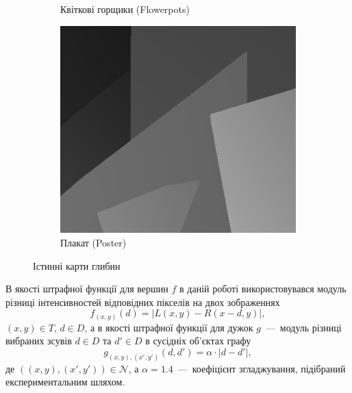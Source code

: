 \begin{figure}[h]
\begin{subfigure}[t]{0.32\textwidth}
        \caption{Квіткові горщики (Flowerpots)}
        \label{fig:flowerpots:ground:truth}
    \end{subfigure}
    \hfill
    \begin{subfigure}[t]{0.32\textwidth}
        \centering
        \includegraphics[width=\textwidth]{images/poster_ground_truth}
        \caption{Плакат (Poster)}
        \label{fig:poster:ground:truth}
    \end{subfigure}
    \caption{Істинні карти глибин}
    \label{fig:ground:truth}
\end{figure}

В якості штрафної функції для вершин $f$
в даній роботі використовувався модуль різниці
інтенсивностей відповідних пікселів на двох зображеннях
\begin{equation*}
    f_{\left(x, y \right)} \left( d \right) =
    \left| L \left(x, y \right) - R \left(x - d, y \right) \right|,
\end{equation*}
$\left(x, y \right) \in T$, $d \in D$,
а в якості штрафної функції для дужок $g$~---~модуль різниці вибраних зсувів
$d \in D$ та $d' \in D$ в сусідніх об'єктах графу
\begin{equation*}
    g_{\left(x, y \right), \left(x', y' \right)} \left(d, d' \right) =
    \alpha \cdot \left| d - d' \right|,
\end{equation*}
де $\left(\left(x, y \right), \left(x', y' \right) \right) \in \mathcal{N}$,
а $\alpha = 1.4$~---~коефіцієнт згладжування,
підібраний експериментальним шляхом.


